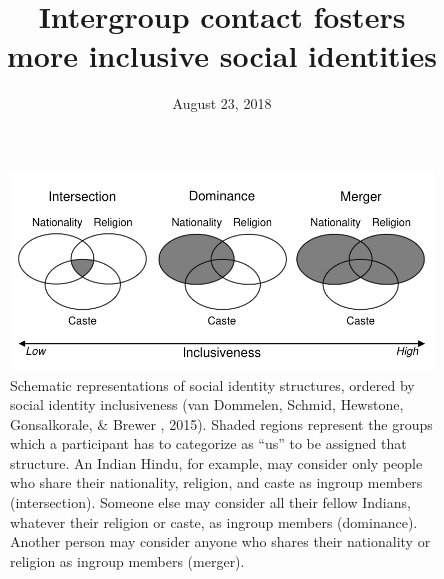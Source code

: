 \documentclass[12pt, a4paper]{article}
\title{Intergroup contact fosters\\more inclusive social identities}
\date{August 23, 2018}
\begin{document}
\begin{figure}
\centering
\includegraphics[scale=1]{../figures/figure-1}
\caption{
Schematic representations of social identity structures, ordered by social identity inclusiveness (van Dommelen, Schmid, Hewstone, Gonsalkorale, \& Brewer , 2015). Shaded regions represent the groups which a participant has to categorize as ``us'' to be assigned that structure. An Indian Hindu, for example, may consider only people who share their nationality, religion, and caste as ingroup members (intersection). Someone else may consider all their fellow Indians, whatever their religion or caste, as ingroup members (dominance). Another person may consider anyone who shares their nationality or religion as ingroup members (merger).
}
\label{fig:f1}
\end{figure}
\end{document}
